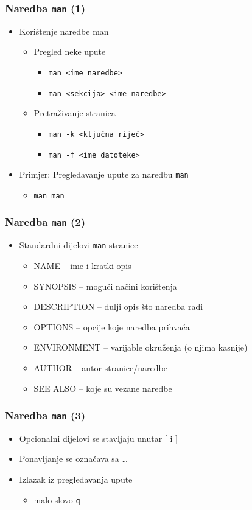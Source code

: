 \documentclass{beamer}
\newcommand{\shell}[1]{\texttt{#1}}
\begin{document}
\begin{frame}[t]
\frametitle{Naredba \shell{man} (1)}
\begin{itemize}
  \item Korištenje naredbe man
  \begin{itemize}
    \item Pregled neke upute
    \begin{itemize}
      \item \shell{man <ime naredbe>}
      \item \shell{man <sekcija> <ime naredbe>}
    \end{itemize}
    \item Pretraživanje stranica
    \begin{itemize}
      \item \shell{man -k <ključna riječ>}
      \item \shell{man -f <ime datoteke>}
    \end{itemize}
  \end{itemize}
  \item Primjer: Pregledavanje upute za naredbu \shell{man}
  \begin{itemize}
    \item \shell{man man}
  \end{itemize}
\end{itemize}
\end{frame}

\begin{frame}[t]
\frametitle{Naredba \shell{man} (2)}
\begin{itemize}
  \item Standardni dijelovi \shell{man} stranice
  \begin{itemize}
    \item NAME -- ime i kratki opis
    \item SYNOPSIS -- mogući načini korištenja
    \item DESCRIPTION -- dulji opis što naredba radi
    \item OPTIONS -- opcije koje naredba prihvaća
    \item ENVIRONMENT -- varijable okruženja (o njima kasnije)
    \item AUTHOR -- autor stranice/naredbe
    \item SEE ALSO -- koje su vezane naredbe
  \end{itemize}
\end{itemize}
\end{frame}

\begin{frame}[t]
\frametitle{Naredba \shell{man} (3)}
\begin{itemize}
  \item Opcionalni dijelovi se stavljaju unutar $[$ i $]$
  \item Ponavljanje se označava sa \ldots
  \item Izlazak iz pregledavanja upute
  \begin{itemize}
    \item malo slovo \shell{q}
  \end{itemize}
\end{itemize}
\end{frame}
\end{document}

